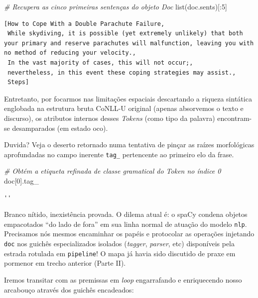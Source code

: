 \documentclass[
  brazilian,
]{article}
\newenvironment{Shaded}{}{}
\newcommand{\BuiltInTok}[1]{#1}
\newcommand{\CommentTok}[1]{\textcolor[rgb]{0.38,0.63,0.69}{\textit{#1}}}
\newcommand{\DecValTok}[1]{\textcolor[rgb]{0.25,0.63,0.44}{#1}}
\newcommand{\NormalTok}[1]{#1}
\begin{document}
\begin{Shaded}
\begin{Highlighting}[]
\CommentTok{\# Recupera as cinco primeiras sentenças do objeto Doc}
\BuiltInTok{list}\NormalTok{(doc.sents)[:}\DecValTok{5}\NormalTok{]}
\end{Highlighting}
\end{Shaded}

\begin{verbatim}
[How to Cope With a Double Parachute Failure,
 While skydiving, it is possible (yet extremely unlikely) that both your primary and reserve parachutes will malfunction, leaving you with no method of reducing your velocity.,
 In the vast majority of cases, this will not occur;,
 nevertheless, in this event these coping strategies may assist.,
 Steps]
\end{verbatim}

Entretanto, por focarmos nas limitações espaciais descartando a riqueza
sintática englobada na estrutura bruta CoNLL-U original (apenas
absorvemos o texto e discurso), os atributos internos desses
\emph{Tokens} (como tipo da palavra) encontram-se desamparados (em
estado oco).

Duvida? Veja o deserto retornado numa tentativa de pinçar as raízes
morfológicas aprofundadas no campo inerente \texttt{tag\_} pertencente
ao primeiro elo da frase.

\begin{Shaded}
\begin{Highlighting}[]
\CommentTok{\# Obtém a etiqueta refinada de classe gramatical do Token no índice 0}
\NormalTok{doc[}\DecValTok{0}\NormalTok{].tag\_}
\end{Highlighting}
\end{Shaded}

\begin{verbatim}
''
\end{verbatim}

Branco nítido, inexistência provada. O dilema atual é: o spaCy condena
objetos empacotados ``do lado de fora'' em sua linha normal de atuação
do modelo \texttt{nlp}. Precisamos nós mesmos encaminhar os papéis e
protocolar as operações injetando \texttt{doc} nos guichês
especializados isolados (\emph{tagger}, \emph{parser}, etc) disponíveis
pela estrada rotulada em \texttt{pipeline}! O mapa já havia sido
discutido de praxe em pormenor em trecho anterior (Parte II).

Iremos transitar com as premissas em \emph{loop} engarrafando e
enriquecendo nosso arcabouço através dos guichês encadeados:
\end{document}
